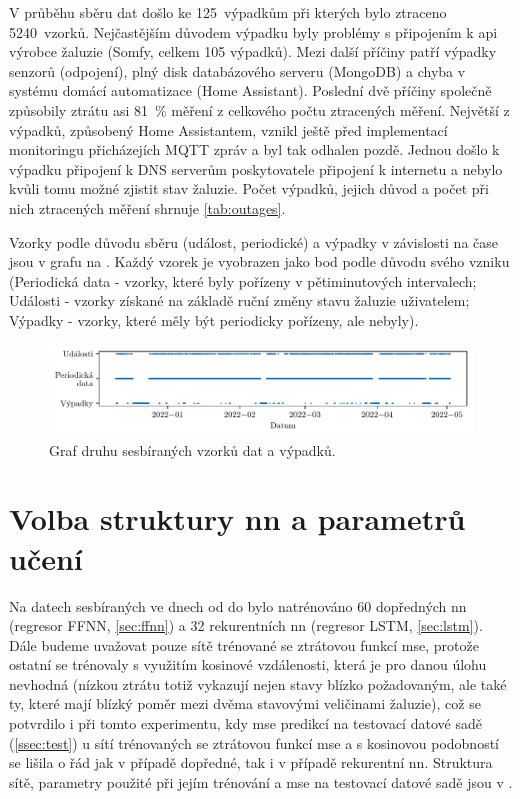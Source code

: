     V průběhu sběru dat došlo ke 125~výpadkům při kterých bylo ztraceno 5240~vzorků. Nejčastějším důvodem výpadku byly problémy s připojením k \acrshort{api} výrobce žaluzie (Somfy, celkem 105 výpadků). Mezi další příčiny patří výpadky senzorů (odpojení), plný disk databázového serveru (MongoDB) a chyba v systému domácí automatizace (Home Assistant). Poslední dvě příčiny společně způsobily ztrátu asi 81~\% měření z celkového počtu ztracených měření. Největší z výpadků, způsobený Home Assistantem, vznikl ještě před implementací monitoringu přicházejích MQTT zpráv a byl tak odhalen pozdě. Jednou došlo k výpadku připojení k DNS serverům poskytovatele připojení k internetu a nebylo kvůli tomu možné zjistit stav žaluzie. Počet výpadků, jejich důvod a počet při nich ztracených měření shrnuje \cref{tab:outages}.
    

    Vzorky podle důvodu sběru (událost, periodické) a výpadky v závislosti na čase jsou v grafu na . Každý vzorek je vyobrazen jako bod podle důvodu svého vzniku (Periodická data - vzorky, které byly pořízeny v pětiminutových intervalech; Události - vzorky získané na základě ruční změny stavu žaluzie uživatelem; Výpadky - vzorky, které měly být periodicky pořízeny, ale nebyly).
    \begin{figure}[H]
        \centering
        \includegraphics[draft=false,width=\textwidth]{img/results/sample_type.pdf}
        \caption[Graf druhu sesbíraných vzorků a výpadků]{Graf druhu sesbíraných vzorků dat a výpadků.}
        \label{fig:sample_type}
    \end{figure}
\section{Volba struktury \acrshort{nn} a parametrů učení}
    Na datech sesbíraných ve dnech od  do  bylo natrénováno 60 dopředných \acrshort{nn} (regresor FFNN, \cref{sec:ffnn}) a 32 rekurentních \acrshort{nn} (regresor LSTM, \cref{sec:lstm}). Dále budeme uvažovat pouze sítě trénované se ztrátovou funkcí \acrshort{mse}, protože ostatní se trénovaly s využitím kosinové vzdálenosti, která je pro danou úlohu nevhodná (nízkou ztrátu totiž vykazují nejen stavy blízko požadovaným, ale také ty, které mají blízký poměr mezi dvěma stavovými veličinami žaluzie), což se potvrdilo i při tomto experimentu, kdy \acrshort{mse} predikcí na testovací datové sadě (\cref{ssec:test}) u sítí trénovaných se ztrátovou funkcí \acrshort{mse} a s kosinovou podobností se lišila o řád jak v případě dopředné, tak i v případě rekurentní \acrshort{nn}. Struktura sítě, parametry použité při jejím trénování a \acrshort{mse} na testovací datové sadě jsou v .
    
    

